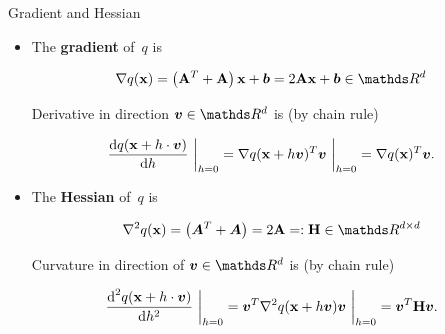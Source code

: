 \documentclass[11pt,compress,t,notes=noshow, xcolor=table]{beamer}
\begin{document}
\begin{vbframe}{Gradient and Hessian}
    
\begin{itemize}
    \item The \textbf{gradient} of~$q$ is
    
        \vspace{-0.5\baselineskip}
        
        \begin{equation*}
            \nabla q(\xv) = \left(\Amat^T + \Amat\right) \xv + \bm{b} = 2 \Amat \xv + \bm{b} \in \R^d
        \end{equation*}

        \vspace{-0.25\baselineskip}
    
        Derivative in direction $\bm{v}\in \R^d$ is (by chain rule)
    
        \begin{equation*}
            \frac{\text{d}q(\mathbf{x} + h \cdot \bm{v})}{\text{d}h}~\bigg\rvert_{h = 0} = \nabla q(\mathbf{x} + h \bm{v})^T \bm{v}~\bigg\rvert_{h = 0} = \nabla q(\mathbf{x})^T \bm{v}.
        \end{equation*}

    \vspace{0.5\baselineskip}

    \item The \textbf{Hessian} of~$q$ is
        
        \vspace{-0.5\baselineskip}
        
        \begin{equation*}
            \nabla^2 q(\xv) = \left(\bm{A}^T + \bm{A}\right) = 2 \Amat =: \mathbf{H} \in \R^{d \times d}
        \end{equation*}    
        
        Curvature in direction of $\bm{v}\in \R^d$ is (by chain rule)

        \vspace{-0.5\baselineskip}
        
        \begin{equation*}
            \frac{\text{d}^2 q(\mathbf{x} + h \cdot \bm{v})}{\text{d} h^2}~\bigg\rvert_{h = 0}
            = \bm{v}^T \nabla^2 q(\mathbf{x} + h \bm{v}) \bm{v}~\bigg\rvert_{h = 0} = \bm{v}^T \mathbf{H} \bm{v}.
        \end{equation*}
\end{itemize}

\end{vbframe}
\end{document}

